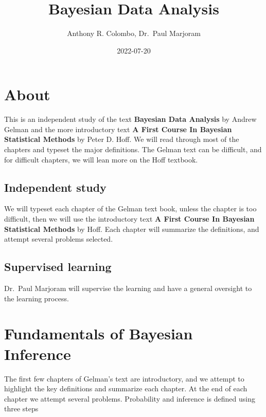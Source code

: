\documentclass[
]{book}
\title{Bayesian Data Analysis}
\author{Anthony R. Colombo, Dr.~Paul Marjoram}
\date{2022-07-20}
\theoremstyle{definition}
\theoremstyle{definition}
\theoremstyle{definition}
\theoremstyle{definition}
\theoremstyle{remark}
\begin{document}
\maketitle

{
\setcounter{tocdepth}{1}
\tableofcontents
}
\hypertarget{about}{%
\chapter*{About}\label{about}}

This is an independent study of the text \textbf{Bayesian Data Analysis} by Andrew Gelman and the more introductory text \textbf{A First Course In Bayesian Statistical Methods} by Peter D. Hoff. We will read through most of the chapters and typeset the major definitions. The Gelman text can be difficult, and for difficult chapters, we will lean more on the Hoff textbook.

\hypertarget{independent-study}{%
\section*{Independent study}\label{independent-study}}

We will typeset each chapter of the Gelman text book, unless the chapter is too difficult, then we will use the introductory text \textbf{A First Course In Bayesian Statistical Methods} by Hoff. Each chapter will summarize the definitions, and attempt several problems selected.

\hypertarget{supervised-learning}{%
\section*{Supervised learning}\label{supervised-learning}}

Dr.~Paul Marjoram will supervise the learning and have a general oversight to the learning process.

\hypertarget{fundamentals-of-bayesian-inference}{%
\chapter{Fundamentals of Bayesian Inference}\label{fundamentals-of-bayesian-inference}}

The first few chapters of Gelman's text are introductory, and we attempt to highlight the key definitions and summarize each chapter. At the end of each chapter we attempt several problems. Probability and inference is defined using three steps
\end{document}

